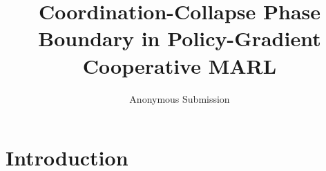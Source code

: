\documentclass[letterpaper]{article}
\title{Coordination-Collapse Phase Boundary in Policy-Gradient Cooperative MARL}
\author{
    Anonymous Submission
}
\theoremstyle{plain}
\begin{document}
\maketitle

\begin{abstract}
%
\end{abstract}

\section{Introduction}
\label{sec:intro}
\end{document}
